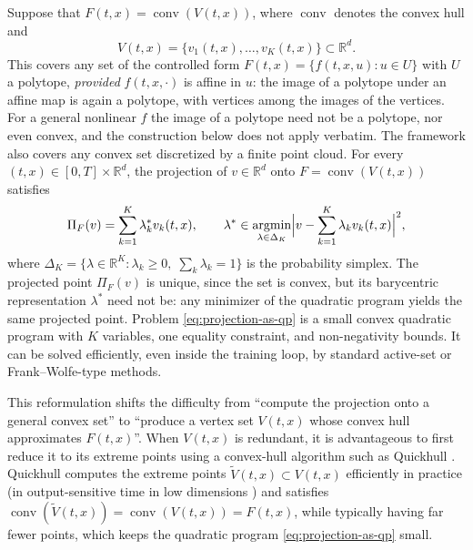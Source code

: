 \documentclass[11pt]{elsarticle}
\theoremstyle{definition}
\theoremstyle{remark}
\numberwithin{equation}{section}
\begin{document}
	Suppose that $F(t,x)=\operatorname{conv}(V(t,x))$, where $\operatorname{conv}$ denotes the convex hull and
	\[
	V(t,x)=\{v_1(t,x),\dots,v_K(t,x)\}\subset\mathbb{R}^d.
	\]
	This covers
	any set of the controlled form $F(t,x)=\{f(t,x,u):u\in U\}$ with $U$ a
	polytope, \emph{provided} $f(t,x,\cdot)$ is affine in $u$: the image of
	a polytope under an affine map is again a polytope, with vertices among
	the images of the vertices. For a general nonlinear $f$ the image of a
	polytope need not be a polytope, nor even convex, and the construction
	below does not apply verbatim. The framework also covers
	any convex set discretized by a finite point cloud.  
	For every $(t,x)\in[0,T]\times\mathbb{R}^d$, the projection of
	$v\in\mathbb{R}^d$ onto
	$F=\operatorname{conv}(V(t,x))$ satisfies
	\begin{equation}\label{eq:projection-as-qp}
		\Pi_F(v)
		=
		\sum_{k=1}^K\lambda_k^\ast v_k(t,x),
		\qquad
		\lambda^\ast
		\in
		\operatorname*{argmin}_{\lambda\in\Delta_K}
		\Bigl|v-\sum_{k=1}^K\lambda_k v_k(t,x)\Bigr|^2,
	\end{equation}
	where $\Delta_K=\{\lambda\in\mathbb{R}^K:\lambda_k\ge0,\;\sum_k\lambda_k=1\}$
	is the probability simplex.  The projected point $\Pi_F(v)$ is unique,
	since the set is convex, but its barycentric representation
	$\lambda^\ast$ need not be: any minimizer of the quadratic program
	yields the same projected point.  Problem \eqref{eq:projection-as-qp} is a
	small convex quadratic program with $K$ variables, one equality
	constraint, and non-negativity bounds.  It can be solved efficiently, even
	inside the training loop, by standard active-set or Frank--Wolfe-type
	methods.
	
	This reformulation shifts the difficulty from ``compute the projection
	onto a general convex set'' to ``produce a vertex set $V(t,x)$ whose
	convex hull approximates $F(t,x)$''.  When $V(t,x)$ is
	redundant, it is advantageous to first reduce it to its extreme points
	using a convex-hull algorithm such as Quickhull \cite{barber1996}.
	Quickhull computes the extreme points $\widetilde{V}(t,x)\subset V(t,x)$
	efficiently in practice (in output-sensitive time in low dimensions
	\cite{barber1996}) and satisfies
	$\operatorname{conv}(\widetilde{V}(t,x))=\operatorname{conv}(V(t,x))=F(t,x)$,
	while typically having far fewer points, which keeps the quadratic
	program \eqref{eq:projection-as-qp} small.
	
\end{document}
